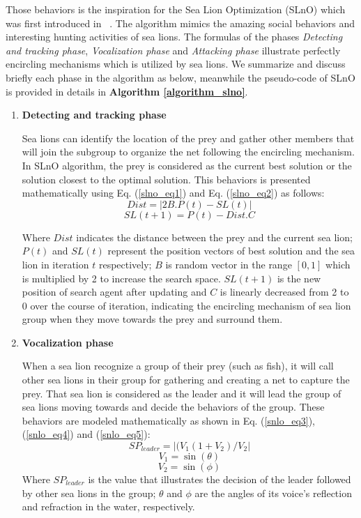 \documentclass[../main.tex]{subfiles}
\begin{document}
	Those behaviors is the inspiration for the Sea Lion Optimization (SLnO) which was first introduced in ~\cite{masadeh2019sea}. The algorithm mimics the amazing social behaviors and interesting hunting activities of sea lions. The formulas of the phases \textit{Detecting and tracking phase}, \textit{Vocalization phase} and \textit{Attacking phase} illustrate perfectly encircling mechanisms which is utilized by sea lions. We summarize and discuss briefly each phase in the algorithm as below, meanwhile the pseudo-code of SLnO is provided in details in \textbf{Algorithm \ref{algorithm_slno}}.

\begin{enumerate}
\item \textbf{Detecting and tracking phase}

	Sea lions can identify the location of the prey and gather other members that will join the subgroup to organize the net following the encircling mechanism. In SLnO algorithm, the prey is considered as the current best solution or the solution closest to the optimal solution. This behaviors is presented mathematically using Eq. (\ref{slno_eq1}) and Eq. (\ref{slno_eq2}) as follows:
\begin{equation}\label{slno_eq1}
Dist = |2B.P(t) - SL(t)|
\end{equation}
\begin{equation}\label{slno_eq2}
SL(t+1) = P(t) - Dist.C
\end{equation}
	
	Where $Dist$ indicates the distance between the prey and the current sea lion; $P(t)$ and $SL(t)$ represent the position vectors of best solution and the sea lion in iteration $t$ respectively; $B$ is random vector in the range $[0, 1]$ which is multiplied by 2 to increase the search space. $SL(t+1)$ is the new position of search agent after updating and $C$ is linearly decreased from 2 to 0 over the course of iteration, indicating the encircling mechanism of sea lion group when they move towards the prey and surround them.

\item \textbf{Vocalization phase}
	
	When a sea lion recognize a group of their prey (such as fish), it will call other sea lions in their group for gathering and creating a net to capture the prey. That sea lion is considered as the leader and it will lead the group of sea lions moving towards and decide the behaviors of the group. These behaviors are modeled mathematically as shown in Eq. (\ref{snlo_eq3}), (\ref{snlo_eq4}) and (\ref{snlo_eq5}):
\begin{equation}\label{snlo_eq3}
SP_{leader} = |(V_1(1+V_2)/V_2|
\end{equation}
\begin{equation}\label{snlo_eq4}
V_1 = \sin(\theta)
\end{equation}
\begin{equation}\label{snlo_eq5}
V_2 = \sin(\phi)
\end{equation}
 Where $SP_{leader}$ is the value that illustrates the decision of the leader followed by other sea lions in the group; $\theta$ and $\phi$ are the angles of its voice's reflection and refraction in the water, respectively.
 

\end{enumerate}
\end{document}

